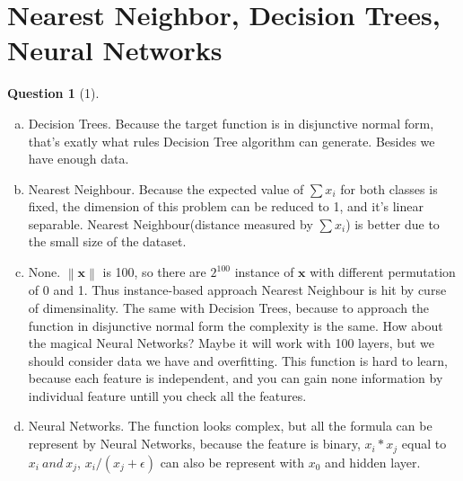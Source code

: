 \documentclass{article}
\newcommand{\norm}[1]{\left\lVert #1 \right\rVert}
\theoremstyle{quest}
\newtheorem*{question}{Question}
\begin{document}
\section*{Nearest Neighbor, Decision Trees, Neural Networks}
\begin{question}[1]
\end{question}
\begin{enumerate}[a.]
\item 
Decision Trees. Because the target function is in disjunctive normal form, that's exatly what rules Decision Tree algorithm can generate. Besides we have enough data.
\item
Nearest Neighbour. Because the expected value of $\sum x_i$ for both classes is fixed, the dimension of this problem can be reduced to 1, and it's linear separable. Nearest Neighbour(distance measured by $\sum x_i$) is better due to the small size of the dataset.
\item
None. $\norm{\mathbf{x}}$ is 100, so there are $2^{100}$ instance of $\mathbf{x}$ with different permutation of 0 and 1. Thus instance-based approach Nearest Neighbour is hit by curse of dimensinality. The same with Decision Trees, because to approach the function in disjunctive normal form the complexity is the same. How about the magical Neural Networks? Maybe it will work with 100 layers, but we should consider data we have and overfitting. This function is hard to learn, because each feature is independent, and you can gain none information by individual feature untill you check all the features. 
\item
Neural Networks. The function looks complex, but all the formula can be represent by Neural Networks, because the feature is binary, $x_i*x_j$ equal to $x_i\  and\  x_j$, $x_i / (x_j+\epsilon)$ can also be represent with $x_0$ and hidden layer.


\end{enumerate}
\end{document}
